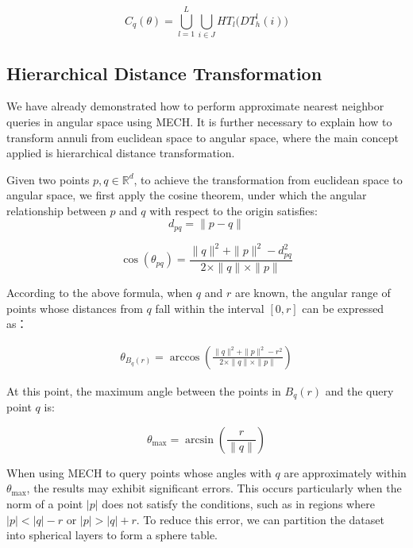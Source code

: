 \documentclass[conference]{IEEEtran}
\begin{document}
\begin{equation*}
C_q(\theta) = \bigcup_{l=1}^L \bigcup_{i \in J} HT_l \big( DT_h^l(i) \big)
\end{equation*}

\subsection{Hierarchical Distance Transformation}
We have already demonstrated how to perform approximate nearest neighbor queries in angular space using MECH. It is further necessary to explain how to transform annuli from euclidean space to angular space, where the main concept applied is hierarchical distance transformation.


Given two points $p, q \in \mathbb{R}^d$,
to achieve the transformation from euclidean space to angular space, we first apply the cosine theorem, under which the angular relationship between $p$ and $q$ with respect to the origin satisfies:
\begin{equation*}
 d_{pq} = \|p - q\|
\end{equation*}


\begin{equation*}
\cos(\theta_{pq}) = \frac{\|q\|^2 + \|p\|^2 - d_{pq}^2}{2 \times \|q\| \times \|p\|} 
\end{equation*}

According to the above formula, when $q$ and $r$ are known, the angular range of points whose distances from $q$ fall within the interval $[0, r]$ can be expressed as：

\begin{equation*}
\begin{aligned}
\theta_{B_q(r)} = \arccos \left( \frac{\|q\|^2 + \|p\|^2 - r^2}{2 \times \|q\| \times \|p\|} \right) 
\end{aligned}
\end{equation*}


At this point, the maximum angle between the points in $B_q(r)$ and the query point $q$ is:


\begin{equation}
\theta_{\max} = \arcsin \left( \frac{r}{\|q\|} \right)
\label{eq01}
\end{equation}

When using MECH to query points whose angles with $q$ are approximately within $\theta_{\max}$, the results may exhibit significant errors.
This occurs particularly when the norm of a point $|p|$ does not satisfy the conditions, such as in regions where $|p| < |q| - r$ or $|p| > |q| + r$.
To reduce this error, we can partition the dataset into spherical layers to form a sphere table.
\end{document}
